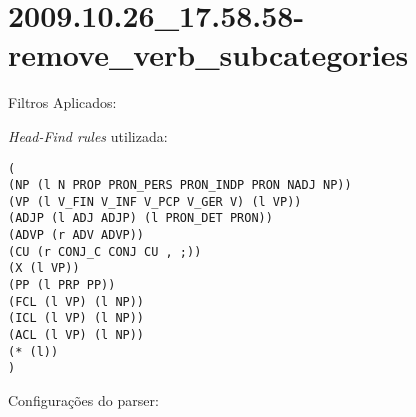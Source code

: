 \section{2009.10.26_17.58.58-remove_verb_subcategories} %
\label{sec:exp:2009.10.26_17.58.58-remove_verb_subcategories}

Filtros Aplicados:

\begin{itemize}
  
  \item{\emph{RemoveVerbSubcategories}
  
\end{itemize}

\emph{Head-Find rules} utilizada:

\scriptsize
\begin{verbatim}
(
(NP (l N PROP PRON_PERS PRON_INDP PRON NADJ NP))
(VP (l V_FIN V_INF V_PCP V_GER V) (l VP))
(ADJP (l ADJ ADJP) (l PRON_DET PRON))
(ADVP (r ADV ADVP))
(CU (r CONJ_C CONJ CU , ;))
(X (l VP))
(PP (l PRP PP))
(FCL (l VP) (l NP))
(ICL (l VP) (l NP))
(ACL (l VP) (l NP))
(* (l))
)

\end{verbatim}

\normalsize

Configurações do parser:


